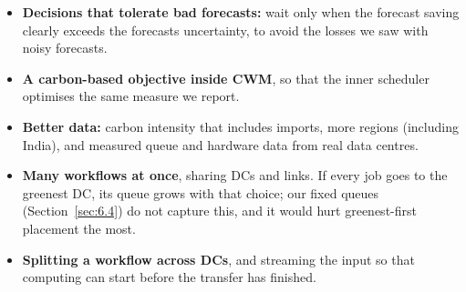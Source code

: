 \documentclass[12pt,a4paper,oneside,openany]{report}
\begin{document}
\begin{itemize}
\item
  \textbf{Decisions that tolerate bad forecasts:} wait only when the
  forecast saving clearly exceeds the forecast\textquotesingle s
  uncertainty, to avoid the losses we saw with noisy forecasts.
\item
  \textbf{A carbon-based objective inside CWM}, so that the inner
  scheduler optimises the same measure we report.
\item
  \textbf{Better data:} carbon intensity that includes imports, more
  regions (including India), and measured queue and hardware data from
  real data centres.
\item
  \textbf{Many workflows at once}, sharing DCs and links. If every job
  goes to the greenest DC, its queue grows with that choice; our fixed
  queues (Section~\ref{sec:6.4}) do not capture this, and it would hurt
  greenest-first placement the most.
\item
  \textbf{Splitting a workflow across DCs}, and streaming the input so
  that computing can start before the transfer has finished.
\end{itemize}
\end{document}
